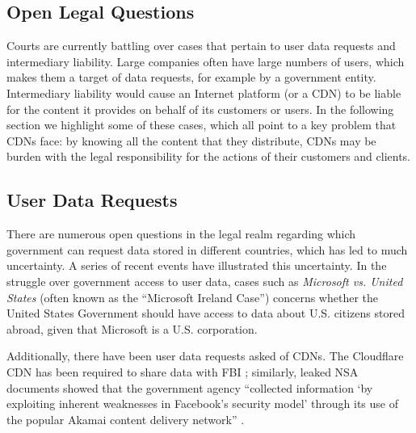 \subsection{Open Legal Questions}

Courts are currently battling over cases that pertain to user data requests and intermediary liability.  Large companies
often have large numbers of users, which makes them a target of data requests, for example by a government entity.  Intermediary 
liability would cause an Internet platform (or a CDN) to be liable for the content it provides on behalf of its customers or users. 
In the following section we highlight some of these cases, which all point to a key problem that CDNs face: by knowing all the content 
that they distribute, CDNs may be burden with the legal responsibility for the actions of their customers and clients.

\subsection{User Data Requests}
There are numerous open questions in the legal realm regarding which government can request data stored in different countries, which 
has led to much uncertainty.  A series of recent events have illustrated this uncertainty.  In the struggle over government access to 
user data, cases such as {\it Microsoft vs. United States} (often known as the ``Microsoft Ireland Case'') concerns whether the United 
States Government should have access to data about U.S. citizens stored abroad, given that Microsoft is a U.S. corporation.  

Additionally, there have been user data requests asked of CDNs.  The Cloudflare CDN has been required
to share data with FBI \cite{cloudflare_nsl}; similarly, leaked NSA documents showed that the government agency ``collected information `by exploiting inherent 
weaknesses in Facebook's security model' through its use of the popular Akamai content delivery network'' \cite{facebook_surv}.

